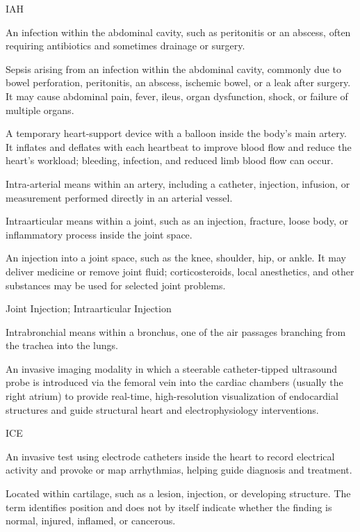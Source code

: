 \synonyms
IAH

 An infection within the abdominal cavity, such as peritonitis or an abscess, often requiring antibiotics and sometimes drainage or surgery.

 Sepsis arising from an infection within the abdominal cavity, commonly due to bowel perforation, peritonitis, an abscess, ischemic bowel, or a leak after surgery. It may cause abdominal pain, fever, ileus, organ dysfunction, shock, or failure of multiple organs.

 A temporary heart-support device with a balloon inside the body’s main artery. It inflates and deflates with each heartbeat to improve blood flow and reduce the heart’s workload; bleeding, infection, and reduced limb blood flow can occur.

 Intra-arterial means within an artery, including a catheter, injection, infusion, or measurement performed directly in an arterial vessel.

 Intraarticular means within a joint, such as an injection, fracture, loose body, or inflammatory process inside the joint space.

 An injection into a joint space, such as the knee, shoulder, hip, or ankle. It may deliver medicine or remove joint fluid; corticosteroids, local anesthetics, and other substances may be used for selected joint problems.

\synonyms
Joint Injection; Intraarticular Injection

 Intrabronchial means within a bronchus, one of the air passages branching from the trachea into the lungs.

 An invasive imaging modality in which a steerable catheter-tipped ultrasound probe is introduced via the femoral vein into the cardiac chambers (usually the right atrium) to provide real-time, high-resolution visualization of endocardial structures and guide structural heart and electrophysiology interventions.

\synonyms
ICE

 An invasive test using electrode catheters inside the heart to record electrical activity and provoke or map arrhythmias, helping guide diagnosis and treatment.

 Located within cartilage, such as a lesion, injection, or developing structure. The term identifies position and does not by itself indicate whether the finding is normal, injured, inflamed, or cancerous.

